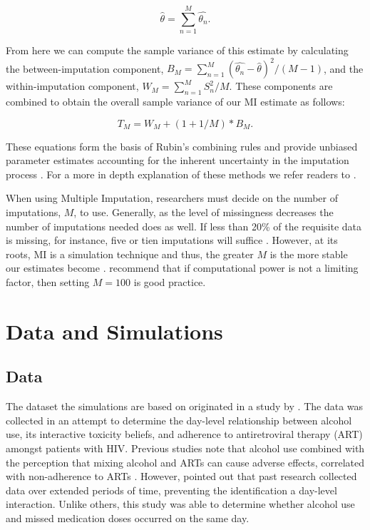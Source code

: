 \documentclass{svjour3}                     %
\begin{document}
\begin{equation}
\widehat{\theta} = \sum_{n=1}^{M} \widehat{\theta_n}.
\end{equation}

From here we can compute the sample variance of this estimate by calculating the between-imputation component, $B_M = \sum_{n=1}^{M} (\widehat{\theta_n} - \widehat{\theta})^2 / (M-1)$, and the within-imputation component, $W_M = \sum_{n=1}^{M} S_n^2 / M$. These components are combined to obtain the overall sample variance of our MI estimate as follows:

\begin{equation}
T_M = W_M + (1+1/M)*B_M.
\end{equation}

These equations form the basis of Rubin's combining rules and provide unbiased parameter estimates accounting for the inherent uncertainty in the imputation process \citep{raghunathan2015missing}. For a more in depth explanation of these methods we refer readers to \citet{little2014statistical}. \par

When using Multiple Imputation, researchers must decide on the number of imputations, $M$, to use. Generally, as the level of missingness decreases the number of imputations needed does as well. If less than 20\% of the requisite data is missing, for instance, five or tien imputations will suffice \citep{raghunathan2015missing}. However, at its roots, MI is a simulation technique and thus, the greater $M$ is the more stable our estimates become \citep{harel2007inferences}. \citet{graham2007many} recommend that if computational power is not a limiting factor, then setting $M=100$ is good practice. \par

\section{Data and Simulations}
\label{sec:2}
\subsection{Data}
\label{sec:2.1}
The dataset the simulations are based on originated in a study by \citet{pellowski2016alcohol}. The data was collected in an attempt to determine the day-level relationship between alcohol use, its interactive toxicity beliefs, and adherence to antiretroviral therapy (ART) amongst patients with HIV. Previous studies note that alcohol use combined with the perception that mixing alcohol and ARTs can cause adverse effects, correlated with non-adherence to ARTs \citep{kalichman2009prevalence, kalichman2012alcohol}. However, \citet{pellowski2016alcohol} pointed out that past research collected data over extended periods of time, preventing the identification a day-level interaction. Unlike others, this study was able to determine whether alcohol use and missed medication doses occurred on the same day. \par
\end{document}

